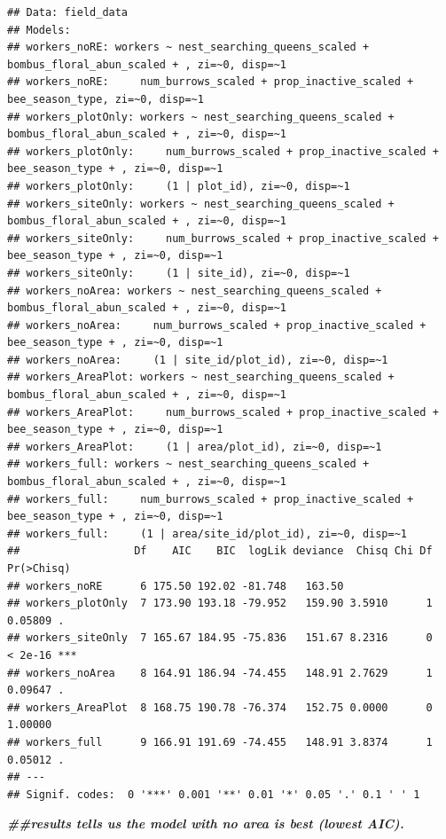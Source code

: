 \documentclass[
]{article}
\newenvironment{Shaded}{\begin{snugshade}}{\end{snugshade}}
\newcommand{\DocumentationTok}[1]{\textcolor[rgb]{0.56,0.35,0.01}{\textbf{\textit{#1}}}}
\begin{document}
\begin{verbatim}
## Data: field_data
## Models:
## workers_noRE: workers ~ nest_searching_queens_scaled + bombus_floral_abun_scaled + , zi=~0, disp=~1
## workers_noRE:     num_burrows_scaled + prop_inactive_scaled + bee_season_type, zi=~0, disp=~1
## workers_plotOnly: workers ~ nest_searching_queens_scaled + bombus_floral_abun_scaled + , zi=~0, disp=~1
## workers_plotOnly:     num_burrows_scaled + prop_inactive_scaled + bee_season_type + , zi=~0, disp=~1
## workers_plotOnly:     (1 | plot_id), zi=~0, disp=~1
## workers_siteOnly: workers ~ nest_searching_queens_scaled + bombus_floral_abun_scaled + , zi=~0, disp=~1
## workers_siteOnly:     num_burrows_scaled + prop_inactive_scaled + bee_season_type + , zi=~0, disp=~1
## workers_siteOnly:     (1 | site_id), zi=~0, disp=~1
## workers_noArea: workers ~ nest_searching_queens_scaled + bombus_floral_abun_scaled + , zi=~0, disp=~1
## workers_noArea:     num_burrows_scaled + prop_inactive_scaled + bee_season_type + , zi=~0, disp=~1
## workers_noArea:     (1 | site_id/plot_id), zi=~0, disp=~1
## workers_AreaPlot: workers ~ nest_searching_queens_scaled + bombus_floral_abun_scaled + , zi=~0, disp=~1
## workers_AreaPlot:     num_burrows_scaled + prop_inactive_scaled + bee_season_type + , zi=~0, disp=~1
## workers_AreaPlot:     (1 | area/plot_id), zi=~0, disp=~1
## workers_full: workers ~ nest_searching_queens_scaled + bombus_floral_abun_scaled + , zi=~0, disp=~1
## workers_full:     num_burrows_scaled + prop_inactive_scaled + bee_season_type + , zi=~0, disp=~1
## workers_full:     (1 | area/site_id/plot_id), zi=~0, disp=~1
##                  Df    AIC    BIC  logLik deviance  Chisq Chi Df Pr(>Chisq)    
## workers_noRE      6 175.50 192.02 -81.748   163.50                             
## workers_plotOnly  7 173.90 193.18 -79.952   159.90 3.5910      1    0.05809 .  
## workers_siteOnly  7 165.67 184.95 -75.836   151.67 8.2316      0    < 2e-16 ***
## workers_noArea    8 164.91 186.94 -74.455   148.91 2.7629      1    0.09647 .  
## workers_AreaPlot  8 168.75 190.78 -76.374   152.75 0.0000      0    1.00000    
## workers_full      9 166.91 191.69 -74.455   148.91 3.8374      1    0.05012 .  
## ---
## Signif. codes:  0 '***' 0.001 '**' 0.01 '*' 0.05 '.' 0.1 ' ' 1
\end{verbatim}

\begin{Shaded}
\begin{Highlighting}[]
\DocumentationTok{\#\#results tells us the model with no area is best (lowest AIC). }
\end{Highlighting}
\end{Shaded}
\end{document}
